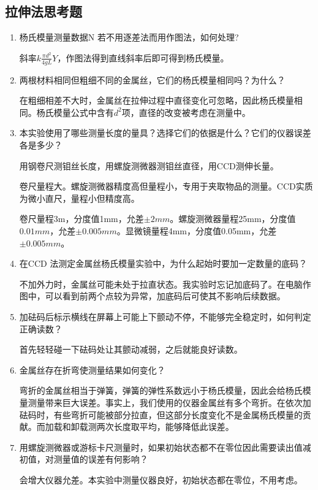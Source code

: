 \documentclass[11pt]{article}
\begin{document}
\subsection{拉伸法思考题}
\begin{enumerate}
    \item 杨氏模量测量数据N 若不用逐差法而用作图法，如何处理?
    \par \hspace*{2em}斜率$k\frac{\pi d^2 }{4gL}Y$，作图法得到直线斜率后即可得到杨氏模量。
    \item 两根材料相同但粗细不同的金属丝，它们的杨氏模量相同吗？为什么？
    \par \hspace*{2em} 在粗细相差不大时，金属丝在拉伸过程中直径变化可忽略，因此杨氏模量相同。杨氏模量公式中含有$d^2$项，直径的改变被考虑在测量中。 
    \item 本实验使用了哪些测量长度的量具？选择它们的依据是什么？它们的仪器误差各是多少？
    \par \hspace*{2em}用钢卷尺测钼丝长度，用螺旋测微器测钼丝直径，用CCD测伸长量。
    \par \hspace*{2em}卷尺量程大。螺旋测微器精度高但量程小，专用于夹取物品的测量。CCD实质为微小直尺，量程小但精度高。
    \par \hspace*{2em}卷尺量程3m，分度值1mm，允差$\pm 2mm$。螺旋测微器量程25mm，分度值$0.01mm$，允差$\pm 0.005mm$。显微镜量程4mm，分度值0.05mm，允差$\pm 0.005mm$。
    \item 在CCD 法测定金属丝杨氏模量实验中，为什么起始时要加一定数量的底码？
    \par \hspace*{2em}不加外力时，金属丝可能未处于拉直状态。我实验时忘记加底码了。在电脑作图中，可以看到前两个点较为异常，加底码后可使其不影响后续数据。
    \item 加砝码后标示横线在屏幕上可能上下颤动不停，不能够完全稳定时，如何判定正确读数？
    \par \hspace*{2em}首先轻轻碰一下砝码处让其颤动减弱，之后就能良好读数。
    \item 金属丝存在折弯使测量结果如何变化？
    \par \hspace*{2em}弯折的金属丝相当于弹簧，弹簧的弹性系数远小于杨氏模量，因此会给杨氏模量测量带来巨大误差。事实上，我们使用的仪器金属丝有多个弯折。在依次加砝码时，有些弯折可能被部分拉直，但这部分长度变化不是金属杨氏模量的贡献。而加载和卸载测两次长度取平均，能够降低此误差。
    \item 用螺旋测微器或游标卡尺测量时，如果初始状态都不在零位因此需要读出值减初值，对测量值的误差有何影响？
    \par \hspace*{2em}会增大仪器允差。本实验中测量仪器良好，初始状态都在零位，不用考虑。
\end{enumerate}
\end{document}
